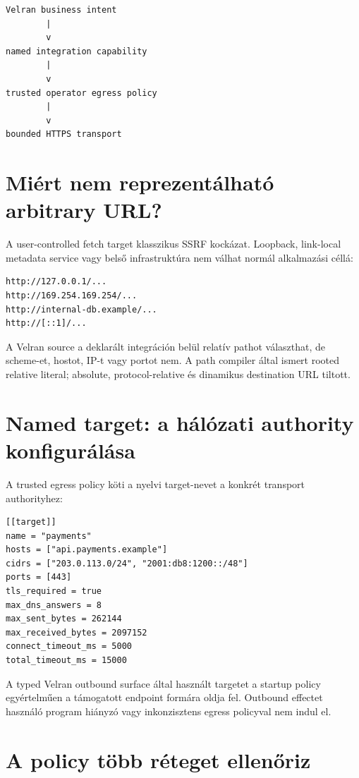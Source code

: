 \begin{lstlisting}
Velran business intent
        |
        v
named integration capability
        |
        v
trusted operator egress policy
        |
        v
bounded HTTPS transport
\end{lstlisting}

\section{Miért nem reprezentálható arbitrary URL?}

A user-controlled fetch target klasszikus SSRF kockázat. Loopback, link-local metadata service vagy belső infrastruktúra nem válhat normál alkalmazási céllá:

\begin{lstlisting}
http://127.0.0.1/...
http://169.254.169.254/...
http://internal-db.example/...
http://[::1]/...
\end{lstlisting}

A Velran source a deklarált integráción belül relatív pathot választhat, de scheme-et, hostot, IP-t vagy portot nem. A path compiler által ismert rooted relative literal; absolute, protocol-relative és dinamikus destination URL tiltott.

\section{Named target: a hálózati authority konfigurálása}

A trusted egress policy köti a nyelvi target-nevet a konkrét transport authorityhez:

\begin{lstlisting}
[[target]]
name = "payments"
hosts = ["api.payments.example"]
cidrs = ["203.0.113.0/24", "2001:db8:1200::/48"]
ports = [443]
tls_required = true
max_dns_answers = 8
max_sent_bytes = 262144
max_received_bytes = 2097152
connect_timeout_ms = 5000
total_timeout_ms = 15000
\end{lstlisting}

A typed Velran outbound surface által használt targetet a startup policy egyértelműen a támogatott endpoint formára oldja fel. Outbound effectet használó program hiányzó vagy inkonzisztens egress policyval nem indul el.

\section{A policy több réteget ellenőriz}

